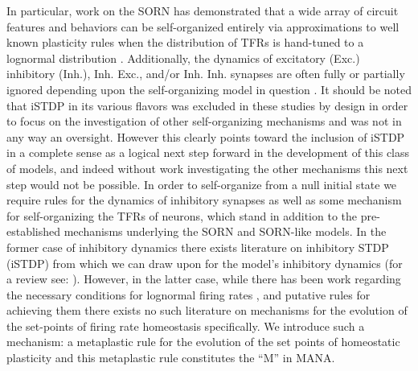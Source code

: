 \documentclass[10pt,letterpaper]{article}
\begin{document}
In particular, work on the SORN has demonstrated that a wide array of circuit features and behaviors can be self-organized entirely via approximations to well known plasticity rules when the distribution of TFRs is hand-tuned to a lognormal distribution \cite{miner2016plasticity}. Additionally, the dynamics of excitatory (Exc.) \textrightarrow inhibitory (Inh.), Inh. \textrightarrow Exc., and/or Inh. \textrightarrow Inh. synapses are often fully or partially ignored depending upon the self-organizing model in question \cite{lazar2009sorn, zheng2013network, miner2016plasticity, effenberger2015self, litwin2014formation}. It should be noted that iSTDP in its various flavors was excluded in these studies by design in order to focus on the investigation of other self-organizing mechanisms and was not in any way an oversight. However this clearly points toward the inclusion of iSTDP in a complete sense as a logical next step forward in the development of this class of models, and indeed without work investigating the other mechanisms this next step would not be possible. In order to self-organize from a null initial state we require rules for the dynamics of inhibitory synapses as well as some mechanism for self-organizing the TFRs of neurons, which stand in addition to the pre-established mechanisms underlying the SORN and SORN-like models. In the former case of inhibitory dynamics there exists literature on inhibitory STDP (iSTDP) from which we can draw upon for the model's inhibitory dynamics \cite{bell1997synaptic, woodin2003coincident, d2015inhibitory, fino2008cell}(for a review see: \cite{kullmann2012plasticity}). However, in the latter case, while there has been work regarding the necessary conditions for lognormal firing rates \cite{roxin2011distribution}\cite{koulakov2009correlated}, and putative rules for achieving them \cite{koulakov2009correlated}\cite{effenberger2015self} there exists no such literature on mechanisms for the evolution of the set-points of firing rate homeostasis specifically. We introduce such a mechanism: a metaplastic rule for the evolution of the set points of homeostatic plasticity and this metaplastic rule constitutes the ``M'' in MANA. 
\end{document}
